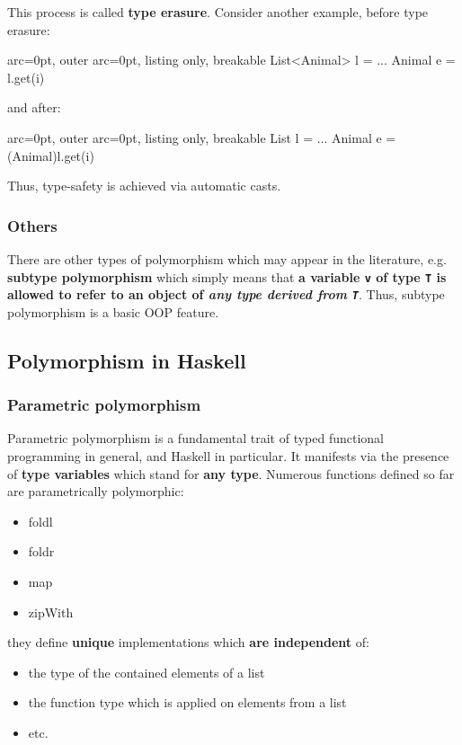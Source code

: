 This process is called \textbf{type erasure}. Consider another example, before type erasure:

\begin{tcblisting}{ arc=0pt, outer arc=0pt, listing only, breakable}
List<Animal> l = ...
Animal e = l.get(i)

\end{tcblisting}


and after:

\begin{tcblisting}{ arc=0pt, outer arc=0pt, listing only, breakable}
List l = ...
Animal e = (Animal)l.get(i)

\end{tcblisting}


Thus, type-safety is achieved via automatic casts.

\subsubsection*{ Others }

There are other types of polymorphism which may appear in the literature, e.g. \textbf{subtype polymorphism} which simply means that \textbf{a variable \texttt{v} of type \texttt{T} is allowed to refer to an object of \textit{any type derived from \texttt{T}}}. Thus, subtype polymorphism is a basic OOP feature.

\subsection*{ Polymorphism in Haskell }

\subsubsection*{ Parametric polymorphism }

Parametric polymorphism is a fundamental trait of typed functional programming in general, and Haskell in particular. It manifests via the presence of \textbf{type variables} which stand for \textbf{any type}. Numerous functions defined so far are parametrically polymorphic:
\begin{itemize}
	\item  foldl
	\item  foldr
	\item  map
	\item  zipWith
\end{itemize}

they define \textbf{unique} implementations which \textbf{are independent} of:
\begin{itemize}
	\item  the type of the contained elements of a list
	\item  the function type which is applied on elements from a list
	\item  etc.
\end{itemize}

